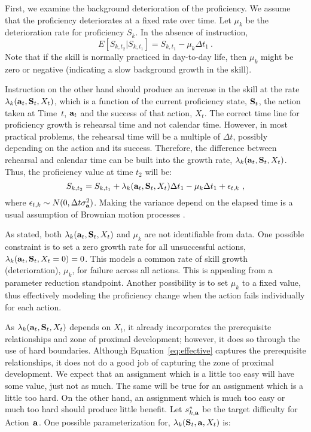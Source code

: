 \documentclass[12pt]{RR-article}
\begin{document}
First, we examine the background deterioration of the proficiency.  We
assume that the proficiency deteriorates at a fixed rate over time.
Let $\mu_k$ be the deterioration rate for proficiency $S_k$.  In the
absence of instruction,
\[
E[S_{k,t_2} | S_{k,t_1}] = S_{k,t_1} - \mu_k\Delta t_1 \ .
\]
Note that if the skill is normally practiced in day-to-day life, then
$\mu_k$ might be zero or negative (indicating a slow background growth
in the skill).

Instruction on the other hand should produce an increase in the skill
at the rate $\lambda_{k}({\bf a}_t,{\bf S}_t, X_t)$, which is a
function of the current proficiency state, ${\bf S}_t$, the action
taken at Time~$t$, ${\bf a}_t$ and the success of that action, $X_t$.
The correct time line for proficiency growth is rehearsal time and not 
calendar time.  However, in most practical problems, the rehearsal time
will be a multiple of $\Delta t$, possibly depending on the action and
its success.  Therefore, the difference between rehearsal and calendar
time can be built into the growth rate, $\lambda_{k}({\bf a}_t,{\bf
S}_t, X_t)$.  Thus, the proficiency value at time $t_2$ will be:
\begin{equation}
\label{eq:lin}
S_{k,t_2} = S_{k,t_1} + \lambda_{k}({\bf a}_t,{\bf S}_t, X_t) \Delta t_1 -
\mu_k\Delta t_1 + \epsilon_{t,k}\ ,
\end{equation}
where $\epsilon_{t,k} \sim N(0,\Delta t \sigma_{\bf a}^2)$.  Making
the variance depend on the elapsed time is a usual assumption of
Brownian motion processes \cite{Ross1989}.  

As stated, both $\lambda_{k}({\bf a}_t,{\bf S}_t, X_t)$ and
$\mu_k$ are not identifiable from data.  One possible constraint is to
set a zero growth rate for all unsuccessful actions, $\lambda_{k}({\bf
a}_t,{\bf S}_t, X_t=0)=0$.  This models a common rate of skill growth
(deterioration), $\mu_k$, for failure across all actions.  This is
appealing from a parameter reduction standpoint.  Another possibility
is to set $\mu_k$ to a fixed value, thus effectively modeling the
proficiency change when the action fails individually for each action.

As $\lambda_{k}({\bf a}_t,{\bf S}_t, X_t)$ depends on $X_t$,
it already incorporates the prerequisite relationships and zone of
proximal development; however, it does so through the use of hard
boundaries.  Although Equation~\ref{eq:effective} captures the
prerequisite relationships, it does not do a good job of capturing the
zone of proximal development.  We expect that an assignment which 
is a little too easy will have some value, just not as much.  The
same will be true for an assignment which is a little too hard.
On the other hand, an assignment which is much too easy or much too
hard should produce little benefit.  Let $s^*_{k,{\bf a}}$ be the
target difficulty for Action~${\bf a}$.  One possible parameterization
for, $\lambda_{k}({\bf S}_t, {\bf a}, X_t)$ is:
\end{document}
